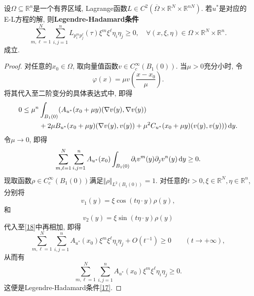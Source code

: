 \begin{proposition}
    设$\Omega \subseteq \mathbb{R}^n$是一个有界区域, Lagrange函数$L \in C^2(\overline{\Omega} \times \mathbb{R}^N \times \mathbb{R}^{nN})$.
    若$u^*$是对应的E-L方程的解, 则\textbf{Legendre-Hadamard条件}
    \begin{equation}\label{17}
        \boxed{\sum_{m, \ell = 1}^N\sum_{i, j = 1}^nL_{p_i^mp_j^\ell}(\tau)\xi^m\xi^\ell\eta_i\eta_j \geq 0, \quad \forall (x, \xi, \eta) \in \Omega \times \mathbb{R}^N \times \mathbb{R}^n.} 
    \end{equation}
    成立.
    \begin{proof}
        对任意的$x_0 \in \Omega$, 取向量值函数$v \in C_c^{\infty}(B_1(0))$. 当$\mu > 0$充分小时, 令 
        \begin{equation*}
            \varphi(x) = \mu v\left(\frac{x - x_0}{\mu}\right). 
        \end{equation*}
        将其代入至二阶变分的具体表达式中, 即得 
        \begin{align*}
            0 \leq \mu^n&\int_{B_1(0)}(A_{u^*}(x_0 + \mu y)(\nabla v(y), \nabla v(y)) \\&
            + 2\mu B_{u^*}(x_0 + \mu y)(\nabla v(y), v(y)) + \mu^2C_{u^*}(x_0 + \mu y)(v(y), v(y))) \,{\rm d}y.
        \end{align*}
        令$\mu \rightarrow 0$, 即得
        \begin{equation}\label{18}
            \sum_{m, \ell = 1}^N\sum_{i, j = 1}^nA_{u^*}(x_0)\int_{B_1(0)}\partial_iv^m(y)\partial_jv^n(y) \,{\rm d}y \geq 0.
        \end{equation}
        现取函数$\rho \in C_c^{\infty}(B_1(0))$满足$\Vert \rho \Vert_{L^2(B_1(0))} = 1$.
        对任意的$t > 0, \xi \in \mathbb{R}^N, \eta \in \mathbb{R}^n$, 分别将 
        \begin{equation*}
            v_1(y) = \xi\cos(t\eta \cdot y)\rho(y), 
        \end{equation*}
        和
        \begin{equation*}
            v_2(y) = \xi\sin(t\eta \cdot y)\rho(y)
        \end{equation*}
        代入至\eqref{18}中再相加, 即得 
        \begin{equation*}
            \sum_{m, \ell = 1}^N\sum_{i, j = 1}^nA_{u^*}(x_0)\xi^m\xi^\ell\eta_i\eta_j + O(t^{-1}) \geq 0 \qquad (t \rightarrow +\infty), 
        \end{equation*}
        从而有 
        \begin{equation*}
            \sum_{m, \ell = 1}^N\sum_{i, j = 1}^nA_{u^*}(x_0)\xi^m\xi^\ell\eta_i\eta_j \geq 0.
        \end{equation*}
        这便是Legendre-Hadamard条件\eqref{17}.
    \end{proof}
\end{proposition}


